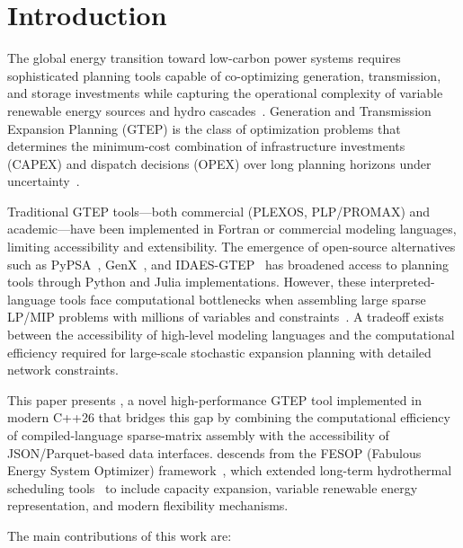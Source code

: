 
\section{Introduction}
\label{sec:introduction}

The global energy transition toward low-carbon power systems requires
sophisticated planning tools capable of co-optimizing generation,
transmission, and storage investments while capturing the operational
complexity of variable renewable energy sources and hydro
cascades~\cite{lumbreras2016progressive}.  Generation and Transmission
Expansion Planning (GTEP) is the class of optimization problems that
determines the minimum-cost combination of infrastructure investments
(CAPEX) and dispatch decisions (OPEX) over long planning horizons under
uncertainty~\cite{hemmati2013comprehensive, mahdavi2019tep_survey}.

Traditional GTEP tools---both commercial (PLEXOS, PLP/PROMAX) and
academic---have been implemented in Fortran or commercial modeling
languages, limiting accessibility and extensibility.  The emergence of
open-source alternatives such as PyPSA~\cite{brown2018pypsa},
GenX~\cite{jenkins2017genx}, and IDAES-GTEP~\cite{idaes_gtep2024} has
broadened access to planning tools through Python and Julia
implementations.  However, these interpreted-language tools face
computational bottlenecks when assembling large sparse LP/MIP problems
with millions of variables and constraints~\cite{frank2016or_opf}.
A tradeoff exists between the accessibility of high-level modeling
languages and the computational efficiency required for large-scale
stochastic expansion planning with detailed network constraints.

This paper presents \gtopt{}, a novel high-performance GTEP tool
implemented in modern C++26 that bridges this gap by combining the
computational efficiency of compiled-language sparse-matrix assembly
with the accessibility of JSON/Parquet-based data
interfaces.  \gtopt{} descends from the FESOP (Fabulous Energy System
Optimizer) framework~\cite{buitrago2022fesop}, which extended long-term
hydrothermal scheduling tools~\cite{pereira2016hydrothermal} to include
capacity expansion, variable renewable energy representation, and modern
flexibility mechanisms.

The main contributions of this work are:


